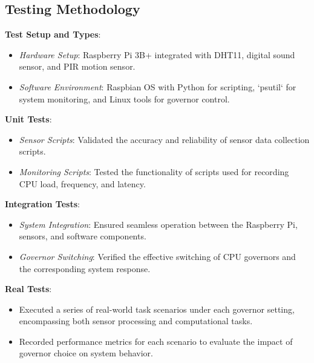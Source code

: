 \documentclass[conference]{IEEEtran}
\begin{document}
\subsection{Testing Methodology}
\textbf{Test Setup and Types}:
\begin{itemize}
    \item \textit{Hardware Setup}: Raspberry Pi 3B+ integrated with DHT11, digital sound sensor, and PIR motion sensor.
    \item \textit{Software Environment}: Raspbian OS with Python for scripting, `psutil` for system monitoring, and Linux tools for governor control.
\end{itemize}

\textbf{Unit Tests}:
\begin{itemize}
    \item \textit{Sensor Scripts}: Validated the accuracy and reliability of sensor data collection scripts.
    \item \textit{Monitoring Scripts}: Tested the functionality of scripts used for recording CPU load, frequency, and latency.
\end{itemize}

\textbf{Integration Tests}:
\begin{itemize}
    \item \textit{System Integration}: Ensured seamless operation between the Raspberry Pi, sensors, and software components.
    \item \textit{Governor Switching}: Verified the effective switching of CPU governors and the corresponding system response.
\end{itemize}

\textbf{Real Tests}:
\begin{itemize}
    \item Executed a series of real-world task scenarios under each governor setting, encompassing both sensor processing and computational tasks.
    \item Recorded performance metrics for each scenario to evaluate the impact of governor choice on system behavior.
\end{itemize}
\end{document}
